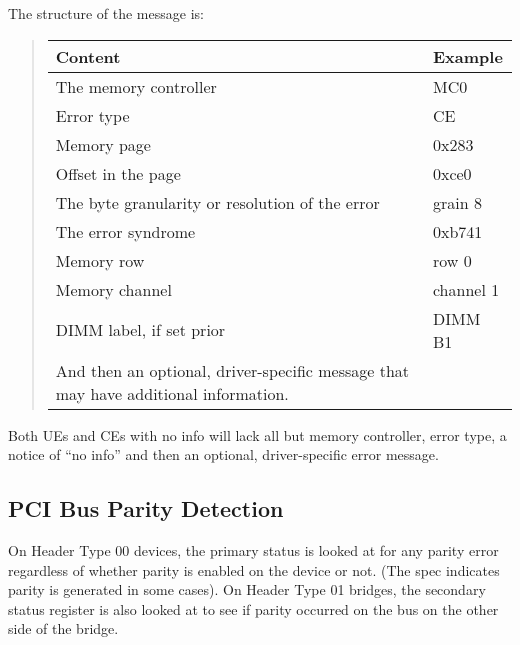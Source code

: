 \documentclass[a4paper,8pt,english]{sphinxmanual}
\begin{document}
The structure of the message is:
\begin{quote}

\begin{tabulary}{\linewidth}{|L|L|}
\hline
\textsf{\relax 
Content
} & \textsf{\relax 
Example
}\\
\hline
The memory controller
 & 
MC0
\\
\hline
Error type
 & 
CE
\\
\hline
Memory page
 & 
0x283
\\
\hline
Offset in the page
 & 
0xce0
\\
\hline
The byte granularity
or resolution of the error
 & 
grain 8
\\
\hline
The error syndrome
 & 
0xb741
\\
\hline
Memory row
 & 
row 0
\\
\hline
Memory channel
 & 
channel 1
\\
\hline
DIMM label, if set prior
 & 
DIMM B1
\\
\hline
And then an optional, driver-specific
message that may have additional
information.
 & \\
\hline\end{tabulary}

\end{quote}

Both UEs and CEs with no info will lack all but memory controller, error
type, a notice of ``no info'' and then an optional, driver-specific error
message.


\subsection{PCI Bus Parity Detection}
\label{admin-guide/ras:pci-bus-parity-detection}
On Header Type 00 devices, the primary status is looked at for any
parity error regardless of whether parity is enabled on the device or
not. (The spec indicates parity is generated in some cases). On Header
Type 01 bridges, the secondary status register is also looked at to see
if parity occurred on the bus on the other side of the bridge.
\end{document}
